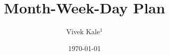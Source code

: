 \documentclass[serif, mathserif, final]{beamer}
\title{Month-Week-Day Plan}\author{Vivek Kale$^1$}\institute{$^1$ University of Illinois at Urbana-Champaign}\date{\today}
\begin{document}
\begin{frame}[label=projectsPlan]

\end{frame}

%



\begin{frame}[label=socialInt]

\end{frame}

\begin{frame}

\end{frame}

%
\end{document}

